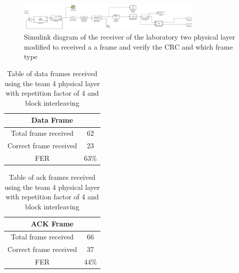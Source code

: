 \begin{figure}[ht]
    \centering
    \includegraphics[width=0.8\textwidth]{receiver_team4.PNG}
    \caption{Simulink diagram of the receiver of the laboratory two physical layer modified to received a a frame and verify the CRC and which frame type }
    \label{fig:receiver_team4}
\end{figure}

\begin{table}[ht]
	\centering
		\begin{tabular}{| c | c | }
		\hline
			\multicolumn{2}{|c|}{Data Frame}\\
		\hline                       
			 Total frame received & 62\\
			 Correct frame received& 23\\
		\hline
			FER & 63\%\\
		\hline
		\end{tabular}
	\caption{Table of data frames received using the team 4 physical layer with repetition factor of 4 and block interleaving}
	\label{tab:team4data}
	\end{table}

\begin{table}[ht]
	\centering
		\begin{tabular}{| c | c | }
		\hline
			\multicolumn{2}{|c|}{ACK Frame}\\ 
		\hline                       
			 Total frame received & 66\\
			 Correct frame received& 37\\
		\hline
			FER & 44\%\\
		\hline
		\end{tabular}
	\caption{Table of ack frames received using the team 4 physical layer with repetition factor of 4 and block interleaving}
	\label{tab:team4ack}
	\end{table}